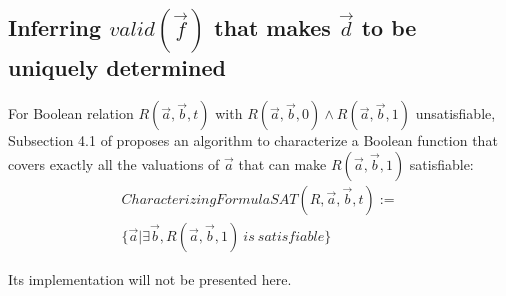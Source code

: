 \documentclass[conference]{IEEEtran}
\begin{document}



\subsection{Inferring $valid(\vec{f})$ that makes $\vec{d}$ to be uniquely determined}\label{subsec_infer}

For Boolean relation $R(\vec{a},\vec{b},t)$ with $R(\vec{a},\vec{b},0)\wedge R(\vec{a},\vec{b},1)$ unsatisfiable,
Subsection 4.1 of \cite{QinTODAES15} proposes an algorithm 
to characterize a Boolean function 
that covers exactly all the valuations of $\vec{a}$ 
that can make $R(\vec{a},\vec{b},1)$ satisfiable:
\begin{multline}\label{eq_charsat}
 CharacterizingFormulaSAT(R,\vec{a},\vec{b},t):=\\\{\vec{a}|\exists \vec{b},R(\vec{a},\vec{b},1)~is~satisfiable\}
\end{multline}

Its implementation will not be presented here.
\end{document}
